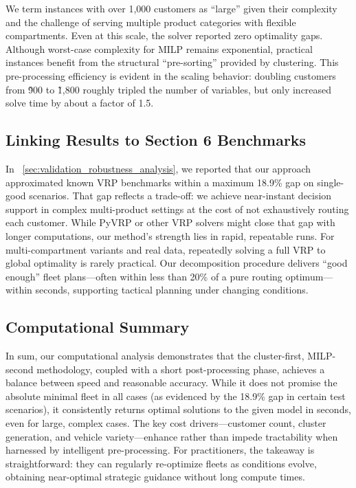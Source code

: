 We term instances with over 1,000 customers as “large” given their complexity and the challenge of serving multiple product categories with flexible compartments. Even at this scale, the solver reported zero optimality gaps. Although worst-case complexity for MILP remains exponential, practical instances benefit from the structural “pre-sorting” provided by clustering. This pre-processing efficiency is evident in the scaling behavior: doubling customers from \~900 to \~1,800 roughly tripled the number of variables, but only increased solve time by about a factor of 1.5. 

\subsection{Linking Results to Section 6 Benchmarks} \label{app:computational:linking-results}

In ~\autoref{sec:validation_robustness_analysis}, we reported that our approach approximated known VRP benchmarks within a maximum 18.9\% gap on single-good scenarios. That gap reflects a trade-off: we achieve near-instant decision support in complex multi-product settings at the cost of not exhaustively routing each customer. While PyVRP or other VRP solvers might close that gap with longer computations, our method’s strength lies in rapid, repeatable runs. For multi-compartment variants and real data, repeatedly solving a full VRP to global optimality is rarely practical. Our decomposition procedure delivers “good enough” fleet plans—often within less than 20\% of a pure routing optimum—within seconds, supporting tactical planning under changing conditions.

\subsection{Computational Summary} \label{app:computational:summary}

In sum, our computational analysis demonstrates that the cluster-first, MILP-second methodology, coupled with a short post-processing phase, achieves a balance between speed and reasonable accuracy. While it does not promise the absolute minimal fleet in all cases (as evidenced by the 18.9\% gap in certain test scenarios), it consistently returns optimal solutions to the given model in seconds, even for large, complex cases. The key cost drivers—customer count, cluster generation, and vehicle variety—enhance rather than impede tractability when harnessed by intelligent pre-processing. For practitioners, the takeaway is straightforward: they can regularly re-optimize fleets as conditions evolve, obtaining near-optimal strategic guidance without long compute times.
